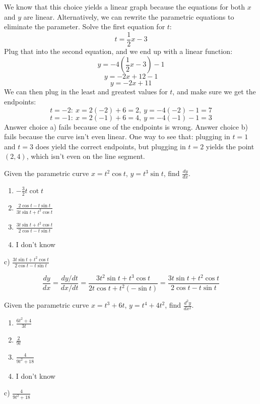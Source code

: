 \documentclass[addpoints,12pt,answers]{exam}
\begin{document}
\begin{questions}
\begin{solution}
    We know that this choice yields a linear graph because the equations for both $x$ and $y$ are linear. Alternatively, we can rewrite the parametric equations to eliminate the parameter. Solve the first equation for $t$:
    $$t=\frac{1}{2}x-3$$
    Plug that into the second equation, and we end up with a linear function:
    $$y=-4\left(\frac{1}{2}x-3\right)-1$$
    $$y=-2x+12-1$$
    $$y=-2x+11$$
    We can then plug in the least and greatest values for $t$, and make sure we get the endpoints:
    $$t=-2: \ x=2(-2)+6=2, \ y=-4(-2)-1=7$$
    $$t=-1: \ x=2(-1)+6=4, \ y=-4(-1)-1=3$$
    Answer choice a) fails because one of the endpoints is wrong. Answer choice b) fails because the curve isn't even linear. One way to see that: plugging in $t=1$ and $t=3$ does yield the correct endpoints, but plugging in $t=2$ yields the point $(2,4)$, which isn't even on the line segment.
  \end{solution}
  \newpage
  \question
  Given the parametric curve $x=t^2\cos t$, $y=t^3\sin t$, find $\displaystyle\frac{dy}{dx}$.
  \begin{enumerate}[label=\alph*)]
    \item
    $\displaystyle-\frac{3}{2}t\cot t$
    \item
    $\displaystyle\frac{2\cos t-t\sin t}{3t\sin t+t^2\cos t}$
    \item
    $\displaystyle\frac{3t\sin t+t^2\cos t}{2\cos t-t\sin t}$
    \item
    I don't know
  \end{enumerate}
  \begin{solution}
    c) $\displaystyle\frac{3t\sin t+t^2\cos t}{2\cos t-t\sin t}$
    
    $$\frac{dy}{dx}=\frac{dy/dt}{dx/dt}=\frac{3t^2\sin t+t^3\cos t}{2t\cos t+t^2(-\sin t)}=\frac{3t\sin t+t^2\cos t}{2\cos t-t\sin t}$$
  \end{solution}
  \newpage
  \question
  Given the parametric curve $x=t^3+6t$, $y=t^4+4t^2$, find $\displaystyle\frac{d^2 y}{dx^2}$.
  \begin{enumerate}[label=\alph*)]
    \item
    $\displaystyle\frac{6t^2+4}{3t}$
    \item
    $\displaystyle\frac{2}{9t}$
    \item
    $\displaystyle\frac{4}{9t^2+18}$
    \item
    I don't know
  \end{enumerate}
  \begin{solution}
    c) $\displaystyle\frac{4}{9t^2+18}$
    

\end{solution}
\end{questions}
\end{document}
